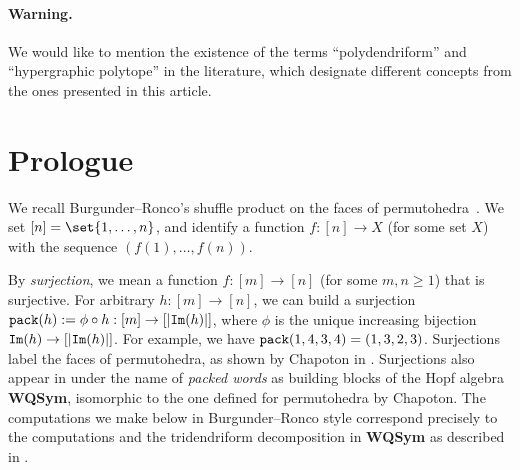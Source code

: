 \paragraph{\bf Warning.}
We  would like to mention the existence of the terms ``polydendriform'' \cite{Samuele} and ``hypergraphic polytope'' \cite{AguiarArdila} 
in the literature, which designate different concepts from the ones presented in this article.


\section{Prologue} \label{Prologue-section}

We recall Burgunder--Ronco's shuffle product on the faces of permutohedra~\cite{BR}.
We set $[n]=\set{1,\ldots,n}$, and identify a function $f:[n]\rightarrow X$ (for some set $X$) with the sequence $(f(1),\ldots,f(n))$.

By {\em surjection}, we mean a function $f:[m]\rightarrow[n]$ (for some $m,n\geq 1$) that is surjective.  
For arbitrary $h:[m]\rightarrow[n]$, we can build a surjection 
${\tt pack}(h):=\phi\circ h: [m]\rightarrow [|{\tt Im}(h)|]$,
where $\phi$ is the unique increasing bijection ${\tt Im}(h)\rightarrow  [|{\tt Im}(h)|]$.
For example, we have
 ${\tt pack}(1,4,3,4)=(1,3,2,3)$. Surjections label the faces of permutohedra, as shown by Chapoton in \cite{Ch00}. Surjections also appear in  \cite{HNT} under the name of {\em packed words}   as building blocks of the Hopf algebra {\bf WQSym}, isomorphic to the one defined for permutohedra by Chapoton.  The computations we make below in Burgunder--Ronco style correspond precisely to the computations and the tridendriform decomposition in {\bf WQSym} as described in \cite{HNT}.
 
